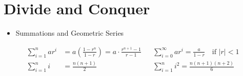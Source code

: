 \section*{Divide and Conquer}
\begin{itemize}
    \item Summations and Geometric Series 
\end{itemize}
{\color{Violet}
\begin{align*}
    \sum^{n}_{i=1} a r^i &= a \left(\frac{1-r^n}{1-r} \right) = a\cdot   \frac{r^{n+1}-1}{r-1}
    &&\sum_{i=0}^\infty ar^i = \frac{a}{1-r} ~~~ \text{ if } |r| < 1 \\
    \sum^n_{i=1} i &= \frac{n(n+1)}{2} 
    &&\sum^n_{i=1}i^2 = \frac{n(n+1)(n+2)}{6}
\end{align*}
}
